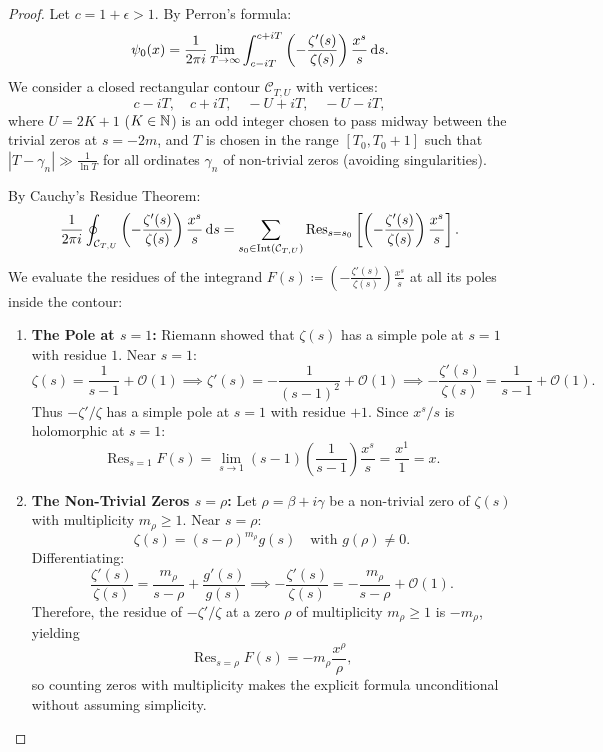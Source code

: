 \begin{proof}
\leanok
Let $c = 1 + \epsilon > 1$. By Perron's formula:
\begin{equation}
\label{eq:perron_psi}
\psi_0(x) = \frac{1}{2\pi i} \lim_{T \to \infty} \int_{c - i T}^{c + i T} \left( -\frac{\zeta'(s)}{\zeta(s)} \right) \frac{x^s}{s} \, \mathrm{d} s.
\end{equation}
We consider a closed rectangular contour $\mathcal{C}_{T, U}$ with vertices:
$$c - i T, \quad c + i T, \quad -U + i T, \quad -U - i T,$$
where $U = 2K + 1$ ($K \in \mathbb{N}$) is an odd integer chosen to pass midway between the trivial zeros at $s = -2m$, and $T$ is chosen in the range $[T_0, T_0 + 1]$ such that $|T - \gamma_n| \gg \frac{1}{\ln T}$ for all ordinates $\gamma_n$ of non-trivial zeros (avoiding singularities).

By Cauchy's Residue Theorem:
\begin{equation}
\label{eq:cauchy_psi_integral}
\frac{1}{2\pi i} \oint_{\mathcal{C}_{T, U}} \left( -\frac{\zeta'(s)}{\zeta(s)} \right) \frac{x^s}{s} \, \mathrm{d} s = \sum_{s_0 \in \operatorname{Int}(\mathcal{C}_{T, U})} \operatorname{Res}_{s = s_0} \left[ \left(-\frac{\zeta'(s)}{\zeta(s)}\right) \frac{x^s}{s} \right].
\end{equation}
We evaluate the residues of the integrand $F(s) \coloneqq \left(-\frac{\zeta'(s)}{\zeta(s)}\right) \frac{x^s}{s}$ at all its poles inside the contour:

\begin{enumerate}
  \item \textbf{The Pole at $s = 1$:}  
  Riemann showed that $\zeta(s)$ has a simple pole at $s = 1$ with residue $1$. Near $s = 1$:
  $$\zeta(s) = \frac{1}{s-1} + \mathcal{O}(1) \implies \zeta'(s) = -\frac{1}{(s-1)^2} + \mathcal{O}(1) \implies -\frac{\zeta'(s)}{\zeta(s)} = \frac{1}{s-1} + \mathcal{O}(1).$$
  Thus $-\zeta'/\zeta$ has a simple pole at $s = 1$ with residue $+1$. Since $x^s / s$ is holomorphic at $s = 1$:
  $$\operatorname{Res}_{s=1} F(s) = \lim_{s \to 1} (s-1) \left(\frac{1}{s-1}\right) \frac{x^s}{s} = \frac{x^1}{1} = x.$$

  \item \textbf{The Non-Trivial Zeros $s = \rho$:}  
  Let $\rho = \beta + i \gamma$ be a non-trivial zero of $\zeta(s)$ with multiplicity $m_\rho \ge 1$. Near $s = \rho$:
  $$\zeta(s) = (s - \rho)^{m_\rho} g(s) \quad \text{with } g(\rho) \neq 0.$$
  Differentiating:
  $$\frac{\zeta'(s)}{\zeta(s)} = \frac{m_\rho}{s - \rho} + \frac{g'(s)}{g(s)} \implies -\frac{\zeta'(s)}{\zeta(s)} = -\frac{m_\rho}{s - \rho} + \mathcal{O}(1).$$
  Therefore, the residue of $-\zeta'/\zeta$ at a zero $\rho$ of multiplicity $m_\rho \ge 1$ is $-m_\rho$, yielding
  $$\operatorname{Res}_{s=\rho} F(s) = -m_\rho \frac{x^\rho}{\rho},$$
  so counting zeros with multiplicity makes the explicit formula unconditional without assuming simplicity.


\end{enumerate}
\end{proof}
